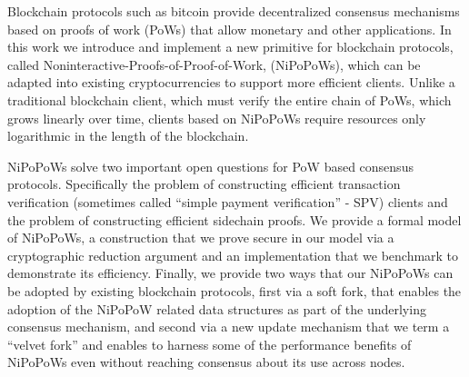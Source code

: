 Blockchain protocols such as bitcoin provide decentralized consensus
mechanisms based on proofs of work (PoWs) 
that allow monetary and other applications. 
%
In this work we introduce and implement a new primitive for blockchain protocols, called Noninteractive-Proofs-of-Proof-of-Work, (NiPoPoWs), which can be adapted into existing cryptocurrencies to support more efficient clients.
Unlike a traditional blockchain client, which must verify the entire chain of PoWs, which grows linearly over time, clients based on NiPoPoWs require resources only logarithmic in the length of the blockchain.

NiPoPoWs solve two important open questions for PoW based consensus
protocols. Specifically the problem  
of constructing efficient transaction verification (sometimes called
``simple payment verification'' - SPV) clients and 
the problem of constructing efficient sidechain proofs. 
%
%
We provide a formal model of NiPoPoWs, a construction that we prove
secure in our model 
via a cryptographic reduction argument and 
an implementation that we benchmark to demonstrate  its efficiency. 
Finally, we provide two ways that our NiPoPoWs can be adopted by
 existing blockchain protocols, first via a soft fork, that enables the 
   adoption of the NiPoPoW related data structures
  as part of the underlying consensus mechanism, 
 and second  via a new update mechanism 
that we term a ``velvet fork'' and enables to harness some of
the performance benefits of NiPoPoWs even without reaching consensus about its use
across nodes. 


